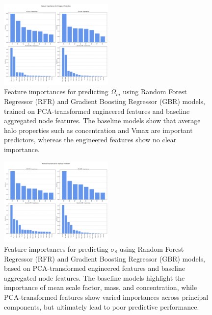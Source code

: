 \documentclass[twocolumn]{aastex631}
\begin{document}
\begin{figure}[h!]
    \centering
    \includegraphics[width=0.5\textwidth]{../input_files/plots/feature_importances_Omega_m_7_20250527-135752.png}
    \caption{Feature importances for predicting $\Omega_m$ using Random Forest Regressor (RFR) and Gradient Boosting Regressor (GBR) models, trained on PCA-transformed engineered features and baseline aggregated node features. The baseline models show that average halo properties such as concentration and Vmax are important predictors, whereas the engineered features show no clear importance.}
    \label{fig:feature_importances_omega_m}
\end{figure}

\begin{figure}[h!]
    \centering
    \includegraphics[width=0.5\textwidth]{../input_files/plots/feature_importances_sigma_8_8_20250527-135752.png}
    \caption{Feature importances for predicting $\sigma_8$ using Random Forest Regressor (RFR) and Gradient Boosting Regressor (GBR) models, based on PCA-transformed engineered features and baseline aggregated node features. The baseline models highlight the importance of mean scale factor, mass, and concentration, while PCA-transformed features show varied importances across principal components, but ultimately lead to poor predictive performance.}
    \label{fig:feature_importances_sigma_8}
\end{figure}
\end{document}
